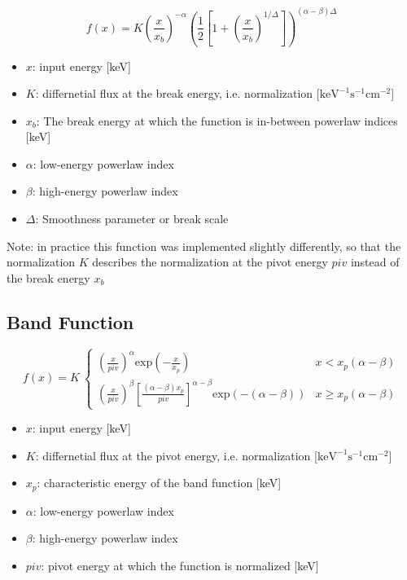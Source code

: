 \documentclass{report}
\begin{document}
\begin{equation}
  f(x) = K \left( \frac{x}{x_b} \right)^{-\alpha}\left( \frac{1}{2} \left[ 1 + \left( \frac{x}{x_b}\right)^{1/\Delta} \right]\right)^{(\alpha - \beta)\Delta}
\end{equation}

\begin{itemize}
  \item $x$: input energy [keV]
  \item $K$: differnetial flux at the break energy, i.e. normalization [$\text{keV}^{-1}\text{s}^{-1}\text{cm}^{-2}$]
  \item $x_b$: The break energy at which the function is in-between powerlaw indices [keV]
  \item $\alpha$: low-energy powerlaw index
  \item $\beta$: high-energy powerlaw index
  \item $\Delta$: Smoothness parameter or break scale
\end{itemize}
Note: in practice this function was implemented slightly differently, so that the normalization $K$ describes the normalization at the pivot energy $piv$ instead of the break energy $x_b$

\subsection*{Band Function}
\begin{equation}
  f(x)= K~\begin{cases}\left( \frac{x}{piv} \right)^{\alpha}\text{exp}(-\frac{x}{x_p}) & x < x_{p}(\alpha - \beta) \\ \left( \frac{x}{piv} \right)^{\beta} \left[ \frac{(\alpha - \beta)x_p}{piv}\right]^{\alpha - \beta} \text{exp}(-(\alpha - \beta))& x \ge x_{p}(\alpha - \beta) \end{cases}
\end{equation}

\begin{itemize}
  \item $x$: input energy [keV]
  \item $K$: differnetial flux at the pivot energy, i.e. normalization [$\text{keV}^{-1}\text{s}^{-1}\text{cm}^{-2}$]
  \item $x_p$: characteristic energy of the band function [keV] 
  \item $\alpha$: low-energy powerlaw index
  \item $\beta$: high-energy powerlaw index
  \item $piv$: pivot energy at which the function is normalized [keV]
\end{itemize}
\end{document}
